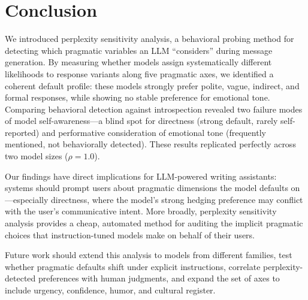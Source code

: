 \section{Conclusion}
\label{sec:conclusion}

We introduced perplexity sensitivity analysis, a behavioral probing method for detecting which pragmatic variables an LLM ``considers'' during message generation. By measuring whether models assign systematically different likelihoods to response variants along five pragmatic axes, we identified a coherent default profile: these models strongly prefer polite, vague, indirect, and formal responses, while showing no stable preference for emotional tone. Comparing behavioral detection against introspection revealed two failure modes of model self-awareness---a blind spot for directness (strong default, rarely self-reported) and performative consideration of emotional tone (frequently mentioned, not behaviorally detected). These results replicated perfectly across two model sizes ($\rho{=}1.0$).

Our findings have direct implications for LLM-powered writing assistants: systems should prompt users about pragmatic dimensions the model defaults on---especially directness, where the model's strong hedging preference may conflict with the user's communicative intent. More broadly, perplexity sensitivity analysis provides a cheap, automated method for auditing the implicit pragmatic choices that instruction-tuned models make on behalf of their users.

Future work should extend this analysis to models from different families, test whether pragmatic defaults shift under explicit instructions, correlate perplexity-detected preferences with human judgments, and expand the set of axes to include urgency, confidence, humor, and cultural register.
